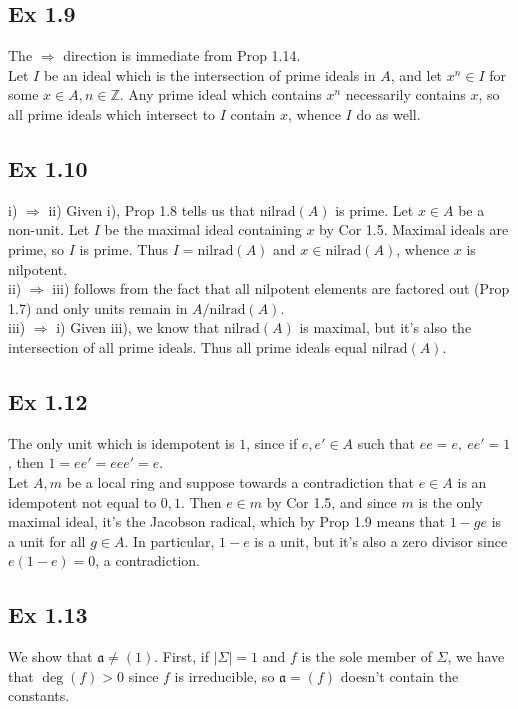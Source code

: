 \documentclass{article}
\theoremstyle{definition}
\newcommand{\Z}{\mathbb{Z}}
\newcommand{\nr}{\text{nilrad}}
\begin{document}
\subsection*{Ex 1.9}
The $\Rightarrow$ direction is immediate from Prop 1.14. \\

Let $I$ be an ideal which is the intersection of prime ideals in $A$, and let
$x^n \in I$ for some $x \in A, n \in \Z$. Any prime ideal which contains $x^n$
necessarily contains $x$, so all prime ideals which intersect to $I$ contain
$x$, whence $I$ do as well.

\subsection*{Ex 1.10}
i) $\Rightarrow$ ii) Given i), Prop 1.8 tells us that $\nr(A)$ is prime. Let $x
	\in A$ be a non-unit. Let $I$ be the maximal ideal containing $x$ by Cor 1.5.
Maximal ideals are prime, so $I$ is prime. Thus $I = \nr(A)$ and $x \in
	\nr(A)$, whence $x$ is nilpotent. \\

ii) $\Rightarrow$ iii) follows from the fact that all nilpotent elements are
factored out (Prop 1.7) and only units remain in $A/\nr(A)$. \\

iii) $\Rightarrow$ i) Given iii), we know that $\nr(A)$ is maximal, but it's
also the intersection of all prime ideals. Thus all prime ideals equal
$\nr(A)$.

\subsection*{Ex 1.12}

The only unit which is idempotent is $1$, since if $e, e' \in A$ such that $ee
	= e,\ ee' = 1$, then $1 = ee' = eee' = e$. \\

Let $A, m$ be a local ring and suppose towards a contradiction that $e \in A$
is an idempotent not equal to $0, 1$. Then $e \in m$ by Cor 1.5, and since $m$
is the only maximal ideal, it's the Jacobson radical, which by Prop 1.9 means
that $1 - ge$ is a unit for all $g \in A$. In particular, $1 - e$ is a unit,
but it's also a zero divisor since $e(1 - e) = 0$, a contradiction.

\subsection*{Ex 1.13}
We show that $\mathfrak{a} \not = (1)$. First, if $|\Sigma| = 1$ and $f$ is the
sole member of $\Sigma$, we have that $\deg(f) > 0$ since $f$ is irreducible,
so $\mathfrak{a} = (f)$ doesn't contain the constants. \\
\end{document}
